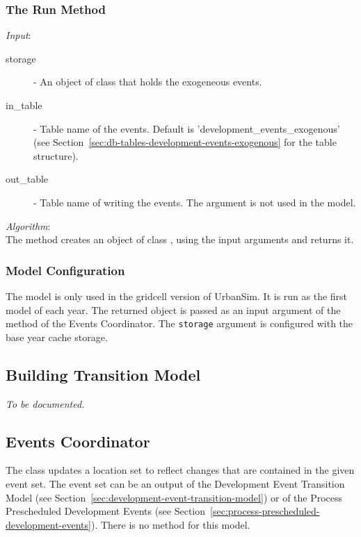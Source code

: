 \subsubsection{The Run Method}
%
{\it Input}:
\begin{description}
\item[storage] - An object of class  that holds the exogeneous events.
\item[in_table] - Table name of the events. Default is 'development_events_exogenous' 
(see Section~\ref{sec:db-tables-development-events-exogenous} for the table structure).
\item[out_table] -  Table name of writing the events. The argument is not used in the model.
\end{description}
%
{\it Algorithm}:\\[1mm]
The method creates an object of class , using the 
input arguments and returns it.

\subsubsection{Model Configuration}
%
The model is only used in the gridcell version of UrbanSim. 
It is run as the first model of each year.
The returned object is passed as an input argument of the  method of the 
Events Coordinator. The \verb|storage| argument is configured with 
the base year cache storage.
%

%
\subsection{Building Transition Model}
%
\label{sec:building-transition-model}
%
{\it To be documented.}


%
\subsection{Events Coordinator}
%
\label{sec:events-coordinator}
%
The class  updates a location set to reflect changes
that are contained in the given event set. The event set can be an output of the Development Event Transition Model
(see Section~\ref{sec:development-event-transition-model})
or of the Process Prescheduled Development Events (see Section~\ref{sec:process-prescheduled-development-events}). 
There is no  method for this model. 
%
